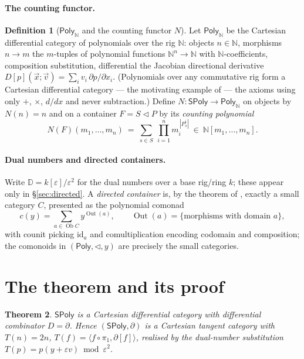 \documentclass[11pt]{article}
\newtheorem{theorem}{Theorem}
\theoremstyle{definition}
\newtheorem{definition}[theorem]{Definition}
\newcommand{\SPoly}{\mathsf{SPoly}}
\newcommand{\PolyN}{\mathsf{Poly}_{\mathbb{N}}}
\newcommand{\Poly}{\mathsf{Poly}}
\newcommand{\N}{\mathbb{N}}
\newcommand{\DD}{\mathbb{D}}
\newcommand{\id}{\mathrm{id}}
\newcommand{\Ob}{\operatorname{Ob}}
\newcommand{\Out}{\operatorname{Out}}
\begin{document}
\paragraph{The counting functor.}
\begin{definition}[$\PolyN$ and the counting functor $N$]\label{def:counting}
Let $\PolyN$ be the Cartesian differential category of polynomials over the rig $\N$: objects $n\in
\N$, morphisms $n\to m$ the $m$-tuples of polynomial functions $\N^n\to\N$ with $\N$-coefficients,
composition substitution, differential the Jacobian directional derivative
$D[p](\vec x;\vec v)=\sum_i v_i\,\partial p/\partial x_i$. (Polynomials over any commutative rig form
a Cartesian differential category --- the motivating example of \cite{BCS2009} --- the axioms using
only $+$, $\times$, $d/dx$ and never subtraction.) Define $N\colon\SPoly\to\PolyN$ on objects by
$N(n)=n$ and on a container $F=S\lhd P$ by its \emph{counting polynomial}
\[
  N(F)(m_1,\dots,m_n)\ =\ \sum_{s\in S}\ \prod_{i=1}^{n} m_i^{\,|P^i_s|}\ \in\ \N[m_1,\dots,m_n].
\]
\end{definition}

\paragraph{Dual numbers and directed containers.}
Write $\DD=k[\varepsilon]/\varepsilon^2$ for the dual numbers over a base rig/ring $k$; these appear
only in \S\ref{sec:directed}. A \emph{directed container} is, by the theorem of
\cite{AhmanUustalu2016}, exactly a small category $C$, presented as the polynomial comonad
\[
  c(y)=\sum_{a\in\Ob C} y^{\Out(a)},\qquad \Out(a)=\{\text{morphisms with domain }a\},
\]
with counit picking $\id_a$ and comultiplication encoding codomain and composition; the comonoids in
$(\Poly,\lhd,y)$ are precisely the small categories.

\section{The theorem and its proof}\label{sec:proof}

\begin{theorem}\label{thm:main}
$\SPoly$ is a Cartesian differential category with differential combinator $D=\partial$. Hence
$(\SPoly,\partial)$ is a Cartesian tangent category with $T(n)=2n$, $T(f)=\langle
f\circ\pi_1,\partial[f]\rangle$, realised by the dual-number substitution $T(p)=p(y+\varepsilon
v)\bmod\varepsilon^2$.
\end{theorem}
\end{document}

